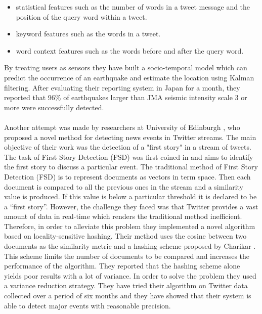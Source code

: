\begin{itemize}
  \item statistical features such as the number of words in a tweet message and the position of the query word within a tweet.\vspace{2pt}
  \item keyword features such as the words in a tweet.\vspace{2pt}
  \item word context features such as the words before and after the query word. 
\end{itemize}\vspace{15pt}
By treating users as sensors they have built a socio-temporal model which can predict the occurrence of an earthquake and estimate the location using Kalman filtering. After evaluating their reporting system in Japan for a month, they reported that 96\% of earthquakes larger than JMA seismic intensity scale 3 or more were successfully detected.\\\\
Another attempt was made by researchers at University of Edinburgh \cite{Petrovic10streamingfirst}, who proposed a novel method for detecting news events in Twitter streams. The main objective of their work was the detection of a "first story" in a stream of tweets. The task of First Story Detection (FSD) was first coined in \cite{Allan:2002:TDT:772260} and aims to identify the first story to discuss a particular event. The traditional method of First Story Detection (FSD) is to represent documents as vectors in term space. Then each document is compared to all the previous ones in the stream and a similarity value is produced. If this value is below a particular threshold it is declared to be a ``first story''. However, the challenge they faced was that Twitter provides a vast amount of data in real-time which renders the traditional method inefficient. Therefore, in order to alleviate this problem they implemented a novel algorithm based on locality-sensitive hashing. Their method uses the cosine between two documents as the similarity metric and a hashing scheme proposed by Charikar \cite{Charikar02similarityestimation}. This scheme limits the number of documents to be compared and increases the performance of the algorithm. They reported that the hashing scheme alone yields poor results with a lot of variance. In order to solve the problem they used a variance reduction strategy. They have tried their algorithm on Twitter data collected over a period of six months and they have showed that their system is able to detect major events with reasonable precision. \\\\
